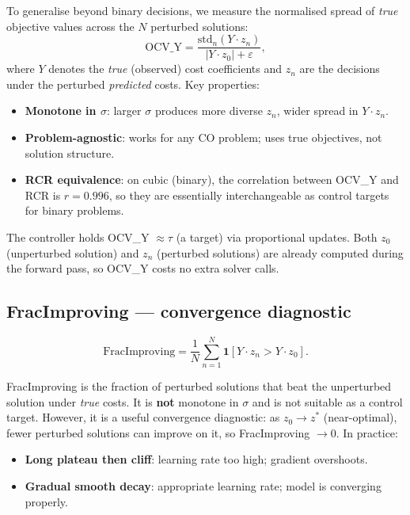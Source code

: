 \documentclass[11pt]{article}
\begin{document}
To generalise beyond binary decisions, we measure the normalised spread
of \emph{true} objective values across the $N$ perturbed solutions:
\begin{equation}
  \mathrm{OCV\_Y} = \frac{\mathrm{std}_n\!\left(Y \cdot z_n\right)}
    {|Y \cdot z_0| + \varepsilon},
  \label{eq:ocvy}
\end{equation}
where $Y$ denotes the \emph{true} (observed) cost coefficients and
$z_n$ are the decisions under the perturbed \emph{predicted} costs.
Key properties:
\begin{itemize}[itemsep=2pt]
  \item \textbf{Monotone in $\sigma$}: larger $\sigma$ produces more
        diverse $z_n$, wider spread in $Y \cdot z_n$.
  \item \textbf{Problem-agnostic}: works for any CO problem;
        uses true objectives, not solution structure.
  \item \textbf{RCR equivalence}: on cubic (binary), the correlation
        between OCV\_Y and RCR is $r = 0.996$, so they are essentially
        interchangeable as control targets for binary problems.
\end{itemize}
The controller holds OCV\_Y $\approx \tau$ (a target) via proportional updates.
Both $z_0$ (unperturbed solution) and $z_n$ (perturbed solutions) are
already computed during the forward pass, so OCV\_Y costs no extra solver calls.

\subsection{FracImproving --- convergence diagnostic}

\begin{equation}
  \mathrm{FracImproving} = \frac{1}{N} \sum_{n=1}^{N}
    \mathbf{1}\!\left[Y \cdot z_n > Y \cdot z_0\right].
  \label{eq:fracimproving}
\end{equation}

FracImproving is the fraction of perturbed solutions that beat the
unperturbed solution under \emph{true} costs.
It is \textbf{not} monotone in $\sigma$ and is not suitable as a control
target. However, it is a useful convergence diagnostic: as $z_0 \to z^*$
(near-optimal), fewer perturbed solutions can improve on it, so
FracImproving $\to 0$. In practice:
\begin{itemize}[itemsep=2pt]
  \item \textbf{Long plateau then cliff}: learning rate too high;
        gradient overshoots.
  \item \textbf{Gradual smooth decay}: appropriate learning rate;
        model is converging properly.
\end{itemize}
\end{document}
